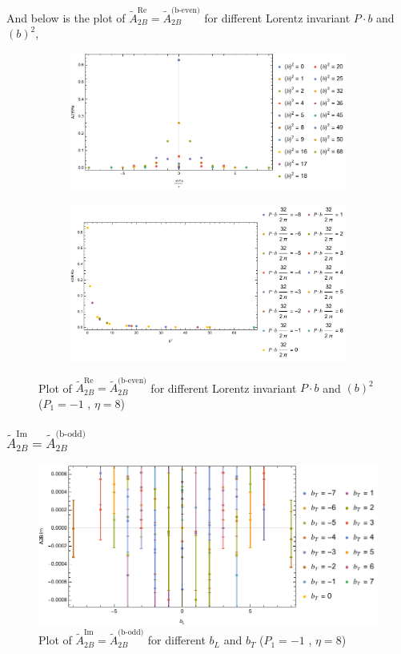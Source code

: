 \documentclass[]{article}
\numberwithin{equation}{section}
\newcommand{\tAmp}{\widetilde{A}}
\newcommand{\tAmp}{\ensuremath{\widetilde{A}^{(+)}}}
\begin{document}
And below is the plot of $\tAmp^{\text{Re}}_{2B}=\tAmp^{\text{(b-even)}}_{2B}$ for different Lorentz invariant $P\cdot b$ and $(b)^2$,
\begin{figure}[h!]
     \centering
     \begin{subfigure}[b]{0.45\textwidth}
         \centering
         \includegraphics[width=\textwidth]{bP_A2B_b_even_P1_-1_eta_8a.pdf}
     \end{subfigure}
     \begin{subfigure}[b]{0.45\textwidth}
         \centering
         \includegraphics[width=\textwidth]{bsq_A2B_b_even_P1_-1_eta_8a.pdf}
     \end{subfigure}
        \caption{Plot of $\tAmp^{\text{Re}}_{2B}=\tAmp^{\text{(b-even)}}_{2B}$ for different Lorentz invariant $P\cdot b$ and $(b)^2$  ($P_{1} = -1$ , $\eta=8$)}
\end{figure}


\subsubsection{$\tAmp^{\text{Im}}_{2B}=\tAmp^{\text{(b-odd)}}_{2B}$}
\begin{figure}[h!]
    \centering
    \includegraphics[width=0.45\linewidth]{bLbT_A2B_b_odd_P1_-1_eta_8a.pdf}
    \caption{Plot of  $\tAmp^{\text{Im}}_{2B}=\tAmp^{\text{(b-odd)}}_{2B}$ for different $b_{L}$ and $b_{T}$  ($P_{1} = -1$ , $\eta=8$)}
\end{figure}
\end{document}
